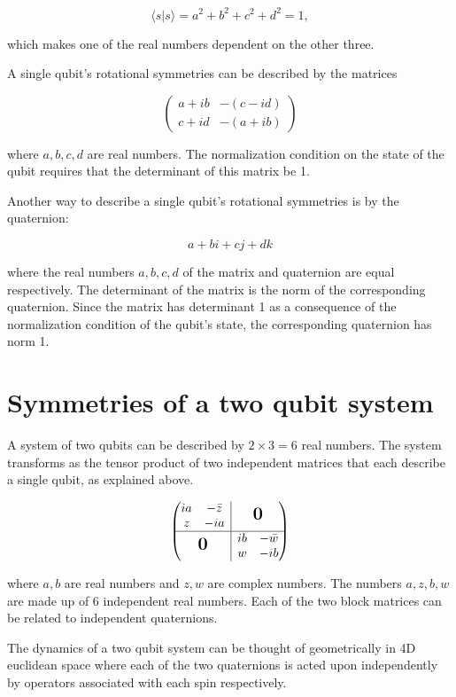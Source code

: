 \documentclass[12pt]{amsart}
\newcommand{\bigzero}{\mbox{\normalfont\Large\bfseries 0}}
\newcommand{\rvline}{\hspace*{-\arraycolsep}\vline\hspace*{-\arraycolsep}}
\begin{document}
\begin{equation}
	\langle s | s\rangle = a^2 + b^2 + c^2 + d^2 = 1,
\end{equation}

which makes one of the real numbers dependent on the other three.

A single qubit's rotational symmetries can be described by the matrices

\begin{equation}
	\begin{pmatrix}
		a + i b & -(c - id) \\
		c + id & -(a + i b)
	\end{pmatrix}
\end{equation}

where $a,b,c,d$ are real numbers. The normalization condition on the state of the qubit requires that the determinant of this matrix be 1. 

Another way to describe a single qubit's rotational symmetries is by the quaternion:

\begin{equation}
	a +bi + cj + dk
\end{equation}

where the real numbers $a,b,c,d$ of the matrix and quaternion are equal respectively. The determinant of the matrix is the norm of the corresponding quaternion. Since the matrix has determinant 1 as a consequence of the normalization condition of the qubit's state, the corresponding quaternion has norm 1.


\section{Symmetries of a two qubit system}

A system of two qubits can be described by $2\times3 = 6$ real numbers. The system transforms as the tensor product of two independent matrices that each describe a single qubit, as explained above.

\begin{equation}
	\begin{pmatrix}
  \begin{matrix}
  i a & -\bar{z} \\
  z & - i a
  \end{matrix}
  & \rvline & \bigzero \\
\hline
  \bigzero & \rvline &
  \begin{matrix}
  i b & -\bar{w} \\
  w & -i b
  \end{matrix}
\end{pmatrix}
\end{equation}

where $a,b$ are real numbers and $z,w$ are complex numbers. The numbers $a,z,b,w$ are made up of 6 independent real numbers. Each of the two block matrices can be related to independent quaternions.

The dynamics of a two qubit system can be thought of geometrically in 4D euclidean space where each of the two quaternions is acted upon independently by operators associated with each spin respectively.
\end{document}

